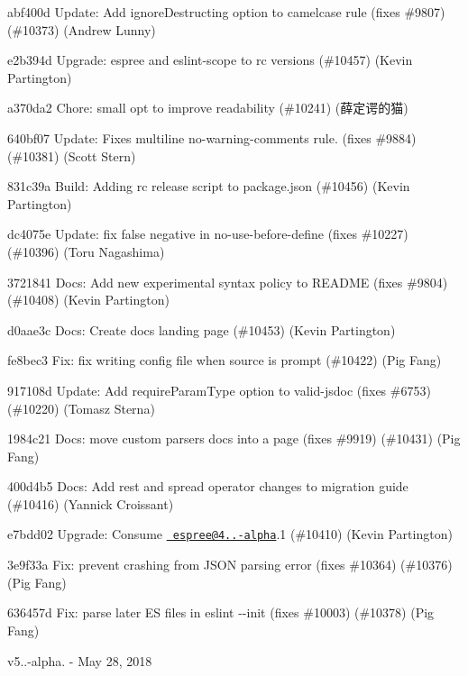 \begin{DoxyItemize}
\item abf400d Update\+: Add ignore\+Destructing option to camelcase rule (fixes \#9807) (\#10373) (Andrew Lunny)
\item e2b394d Upgrade\+: espree and eslint-\/scope to rc versions (\#10457) (Kevin Partington)
\item a370da2 Chore\+: small opt to improve readability (\#10241) (薛定谔的猫)
\item 640bf07 Update\+: Fixes multiline no-\/warning-\/comments rule. (fixes \#9884) (\#10381) (Scott Stern)
\item 831c39a Build\+: Adding rc release script to package.\+json (\#10456) (Kevin Partington)
\item dc4075e Update\+: fix false negative in no-\/use-\/before-\/define (fixes \#10227) (\#10396) (Toru Nagashima)
\item 3721841 Docs\+: Add new experimental syntax policy to README (fixes \#9804) (\#10408) (Kevin Partington)
\item d0aae3c Docs\+: Create docs landing page (\#10453) (Kevin Partington)
\item fe8bec3 Fix\+: fix writing config file when {\ttfamily source} is {\ttfamily prompt} (\#10422) (Pig Fang)
\item 917108d Update\+: Add require\+Param\+Type option to valid-\/jsdoc (fixes \#6753) (\#10220) (Tomasz Sterna)
\item 1984c21 Docs\+: move custom parsers docs into a page (fixes \#9919) (\#10431) (Pig Fang)
\item 400d4b5 Docs\+: Add rest and spread operator changes to migration guide (\#10416) (Yannick Croissant)
\item e7bdd02 Upgrade\+: Consume \href{mailto:espree@4.0.0-alpha}{\texttt{ espree@4..-\/alpha}}.1 (\#10410) (Kevin Partington)
\item 3e9f33a Fix\+: prevent crashing from JSON parsing error (fixes \#10364) (\#10376) (Pig Fang)
\item 636457d Fix\+: parse later ES files in {\ttfamily eslint -\/-\/init} (fixes \#10003) (\#10378) (Pig Fang)
\end{DoxyItemize}

v5..-\/alpha. -\/ May 28, 2018


